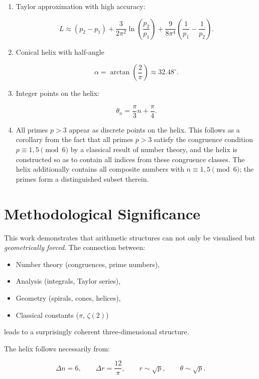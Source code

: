 \begin{enumerate}
\item Taylor approximation with high accuracy:


\[
L \approx (p_2 - p_1)
+ \frac{3}{2\pi^2}\ln\!\left(\frac{p_2}{p_1}\right)
+ \frac{9}{8\pi^4}\left(\frac{1}{p_1} - \frac{1}{p_2}\right).
\]



\item Conical helix with half-angle


\[
\alpha = \arctan\!\left(\frac{2}{\pi}\right)
\approx 32.48^\circ.
\]



\item Integer points on the helix:


\[
\theta_n = \frac{\pi}{3}n + \frac{\pi}{4}.
\]



\item All primes $p>3$ appear as discrete points on the helix.
This follows as a corollary from the fact that all primes $p>3$
satisfy the congruence condition $p\equiv1,5\pmod{6}$ by a classical
result of number theory, and the helix is constructed so as to contain
all indices from these congruence classes. The helix additionally
contains all composite numbers with $n\equiv1,5\pmod{6}$; the primes
form a distinguished subset therein.
\end{enumerate}

\section{Methodological Significance}

This work demonstrates that arithmetic structures can not only be visualised
but \emph{geometrically forced}. The connection between:

\begin{itemize}
\item Number theory (congruences, prime numbers),
\item Analysis (integrals, Taylor series),
\item Geometry (spirals, cones, helices),
\item Classical constants ($\pi$, $\zeta(2)$)
\end{itemize}

leads to a surprisingly coherent three-dimensional structure.

The helix follows necessarily from:



\[
\Delta n = 6,
\qquad
\Delta r = \frac{12}{\pi},
\qquad
r \sim \sqrt{p},
\qquad
\theta \sim \sqrt{p}.
\]



